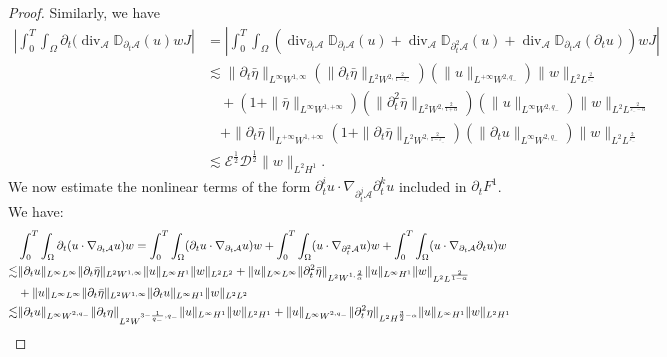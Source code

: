 \documentclass[letterpaper,reqno,10pt,twoside]{amsart}
\theoremstyle{definition}
\theoremstyle{remark}
\def\p{\partial}
\begin{document}
\begin{proof}
			\noindent Similarly, we have
			\[
			\begin{aligned}
				\left|\int_{0}^{T}\int_{\Omega}\p_{t}(\operatorname{div}_{\mathcal{A}}\mathbb{D}_{\partial_{t}\mathcal{A}}(u)w J \right| & = \left| \int_{0}^{T}\int_{\Omega}(\operatorname{div}_{\p_{t}\mathcal{A}}\mathbb{D}_{\p_{t}\mathcal{A}}(u)+\operatorname{div}_{\mathcal{A}}\mathbb{D}_{\p_{t}^{2}\mathcal{A}}(u)+\operatorname{div}_{\mathcal{A}}\mathbb{D}_{\p_{t}\mathcal{A}}(\p_{t}u))w J\right|\\
				&\lesssim \|\p_{t}\bar{\eta}\|_{L^{\infty}W^{1,\infty}}(\|\p_{t}\bar{\eta}\|_{L^{2}W^{2,\frac{2}{1-\varepsilon_{-}}}})(\|u\|_{L^{+\infty}W^{2,q_{-}}})\|w\|_{L^{2}L^{\frac{2}{\varepsilon_{-}}}}\\
				&\quad+(1+\|\bar{\eta}\|_{L^{\infty}W^{1,+\infty}})(\|\p_{t}^{2}\bar{\eta}\|_{L^{2}W^{2,\frac{2}{1+\alpha}}})(\|u\|_{L^{\infty}W^{2,q_{-}}})\|w\|_{L^{2}L^{\frac{2}{\varepsilon_{-}-\alpha}}}\\
				&\quad+\|\p_{t}\bar{\eta}\|_{L^{+\infty}W^{1,+\infty}}(1+\|\p_{t}\bar{\eta}\|_{L^{2}W^{2,\frac{2}{1-\varepsilon_{-}}}})(\|\p_{t}u\|_{L^{\infty}W^{2,q_{-}}})\|w\|_{L^{2}L^{\frac{2}{\varepsilon_{-}}}}\\
				&\lesssim \mathscr{E}^{\frac{1}{2}}\mathscr{D}^{\frac{1}{2}}\|w\|_{L^{2}H^{1}}.
			\end{aligned}
			\]
			We now estimate the nonlinear terms of the form $\partial_{t}^{i}u\cdot \nabla_{\partial_{t}^{j}\mathcal{A}}\partial_{t}^{k}u$ included in $\p_{t}F^{1}$. We have:
			\[\begin{aligned}
				& \int_{0}^{T}\int_{\Omega}\p_{t}(u\cdot \nabla_{\p_{t}\mathcal{A}}u)w= \int_{0}^{T}\int_{\Omega}(\p_{t}u\cdot \nabla_{\p_{t}\mathcal{A}}u)w+\int_{0}^{T}\int_{\Omega}(u\cdot \nabla_{\p_{t}^{2}\mathcal{A}}u)w +\int_{0}^{T}\int_{\Omega}(u\cdot \nabla_{\p_{t}\mathcal{A}}\p_{t}u)w\notag\\
				\lesssim& \|\p_{t}u\|_{L^{\infty}L^{\infty}}\|\p_{t}\bar{\eta}\|_{L^{2}W^{1,\infty}}\|u\|_{L^{\infty}H^{1}}\|w\|_{L^{2}L^{2}}\notag +\|u\|_{L^{\infty}L^{\infty}}\|\p_{t}^{2}\bar{\eta}\|_{L^{2}W^{1,\frac{2}{\alpha}}}\|u\|_{L^{\infty}H^{1}}\|w\|_{L^{2}L^{\frac{2}{1-\alpha}}}\notag\\
				&+\|u\|_{L^{\infty}L^{\infty}}\|\p_{t}\bar{\eta}\|_{L^{2}W^{1,\infty}}\|\p_{t}u\|_{L^{\infty}H^{1}}\|w\|_{L^{2}L^{2}}\notag\\
				\lesssim&\|\p_{t}u\|_{L^{\infty}W^{2,q_{-}}}\|\p_{t}{\eta}\|_{L^{2}W^{3-\frac{1}{q_{-}},q_{-}}}\|u\|_{L^{\infty}H^{1}}\|w\|_{L^{2}H^{1}}+\|u\|_{L^{\infty}W^{2,q_{-}}}\|\p_{t}^{2}{\eta}\|_{L^{2}H^{\frac{3}{2}-\alpha}}\|u\|_{L^{\infty}H^{1}}\|w\|_{L^{2}H^{1}}\notag\\

\end{aligned}\]
\end{proof}
\end{document}

